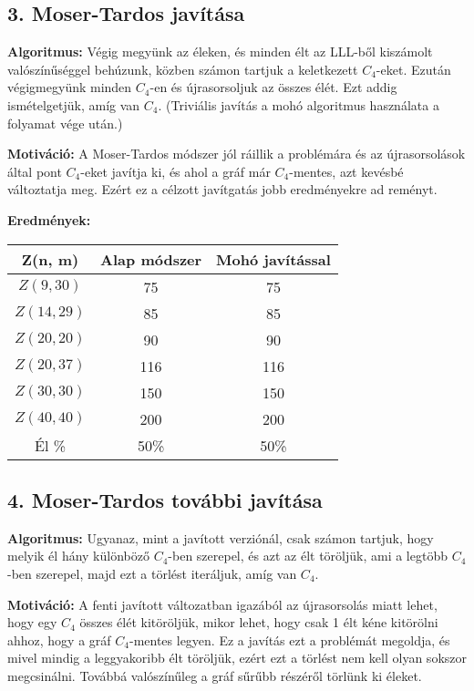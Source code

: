\documentclass[12pt,a4paper]{article}
\begin{document}
\subsection*{3. Moser-Tardos javítása}

\textbf{Algoritmus:} Végig megyünk az éleken, és minden élt az LLL-ből kiszámolt valószínűséggel behúzunk, közben számon tartjuk a keletkezett $C_4$-eket. Ezután végigmegyünk minden $C_4$-en és újrasorsoljuk az összes élét. Ezt addig ismételgetjük, amíg van $C_4$. (Triviális javítás a mohó algoritmus használata a folyamat vége után.)

\textbf{Motiváció:} A Moser-Tardos módszer jól ráillik a problémára és az újrasorsolások által pont $C_4$-eket javítja ki, és ahol a gráf már $C_4$-mentes, azt kevésbé változtatja meg. Ezért ez a célzott javítgatás jobb eredményekre ad reményt.

\textbf{Eredmények:}
\begin{table}[H]
\centering
\begin{tabular}{|c|c|c|}
\hline
\textbf{Z(n, m)} & \textbf{Alap módszer} & \textbf{Mohó javítással} \\
\hline
$Z(9,30)$  & 75 & 75 \\
$Z(14, 29)$ & 85 & 85 \\
$Z(20, 20)$ & 90 & 90 \\
$Z(20, 37)$ & 116 & 116 \\
$Z(30, 30)$ & 150 & 150 \\
$Z(40, 40)$ & 200 & 200 \\
\hline
Él \% & 50\% & 50\% \\
\hline
\end{tabular}
\end{table}
\subsection*{4. Moser-Tardos további javítása}

\textbf{Algoritmus:} Ugyanaz, mint a javított verziónál, csak számon tartjuk, hogy melyik él hány különböző $C_4$-ben szerepel, és azt az élt töröljük, ami a legtöbb $C_4$-ben szerepel, majd ezt a törlést iteráljuk, amíg van $C_4$.

\textbf{Motiváció:} A fenti javított változatban igazából az újrasorsolás miatt lehet, hogy egy $C_4$ összes élét kitöröljük, mikor lehet, hogy csak 1 élt kéne kitörölni ahhoz, hogy a gráf $C_4$-mentes legyen. Ez a javítás ezt a problémát megoldja, és mivel mindig a leggyakoribb élt töröljük, ezért ezt a törlést nem kell olyan sokszor megcsinálni. Továbbá valószínűleg a gráf sűrűbb részéről törlünk ki éleket.
\end{document}
